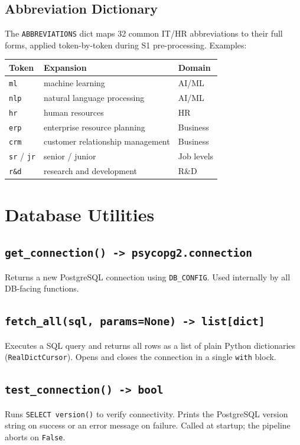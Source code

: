﻿\documentclass[12pt,a4paper]{article}
\begin{document}
\subsection{Abbreviation Dictionary}

The \texttt{ABBREVIATIONS} dict maps 32 common IT/HR abbreviations to their full forms, applied token-by-token during S1 pre-processing. Examples:

\begin{longtable}{@{}P{3cm}P{5cm}P{6.5cm}@{}}
\toprule
\textbf{Token} & \textbf{Expansion} & \textbf{Domain} \\
\midrule
\endhead
\texttt{ml} & machine learning & AI/ML \\
\texttt{nlp} & natural language processing & AI/ML \\
\texttt{hr} & human resources & HR \\
\texttt{erp} & enterprise resource planning & Business \\
\texttt{crm} & customer relationship management & Business \\
\texttt{sr} / \texttt{jr} & senior / junior & Job levels \\
\texttt{r\&d} & research and development & R\&D \\
\bottomrule
\end{longtable}

\clearpage
\section{Database Utilities}

\subsection{\texttt{get\_connection() -> psycopg2.connection}}
Returns a new PostgreSQL connection using \texttt{DB\_CONFIG}. Used internally by all DB-facing functions.

\subsection{\texttt{fetch\_all(sql, params=None) -> list[dict]}}
Executes a SQL query and returns all rows as a list of plain Python dictionaries (\texttt{RealDictCursor}). Opens and closes the connection in a single \texttt{with} block.

\subsection{\texttt{test\_connection() -> bool}}
Runs \texttt{SELECT version()} to verify connectivity. Prints the PostgreSQL version string on success or an error message on failure. Called at startup; the pipeline aborts on \texttt{False}.
\end{document}
